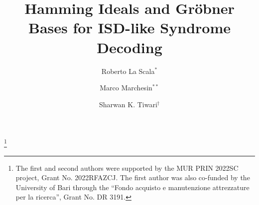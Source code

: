 \documentclass{amsart}
\begin{document}
\title[Hamming Ideals and Gr\"obner Bases for Syndrome Decoding]
{Hamming Ideals and Gr\"obner Bases for ISD-like Syndrome Decoding}


\author[R. La Scala]{Roberto La Scala$^*$}

\author[M. Marchesin]{Marco Marchesin$^{**}$}

\author[S.K. Tiwari]{Sharwan K. Tiwari$^{\dagger}$}


\address{$^*$ Dipartimento di Fisica, Universit\`a degli Studi di Bari
``Aldo Moro'', Via Orabona 4, 70125 Bari, Italy}

\address{$^{**}$ Dipartimento di Matematica, Universit\`a degli Studi di Bari
``Aldo Moro'', Via Orabona 4, 70125 Bari, Italy}

\address{$^{\dagger}$ Cryptography Research Centre, Technology Innovation Institute,
Abu Dhabi, United Arab Emirates}

\thanks{
The first and second authors were supported by the MUR PRIN 2022SC project, Grant No. 2022RFAZCJ.
The first author was also co-funded by the University of Bari through the ``Fondo acquisto e manutenzione
attrezzature per la ricerca'', Grant No. DR 3191.
}

\end{document}
